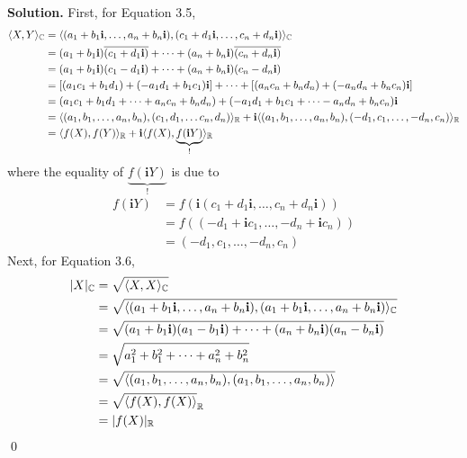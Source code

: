 \documentclass[12pt]{book}
\theoremstyle{definition}
\newenvironment{solution}
{%
  \par\noindent\textbf{Solution.}\quad
}
{%
  \qed\par
}
\begin{document}
\begin{solution} First, for Equation 3.5,
  \[
  \begin{aligned}
      \langle X, Y \rangle_{\mathbb{C}} &= \langle (a_1 + b_1\mathbf{i}, \dots , a_n + b_n\mathbf{i}), (c_1+d_1\mathbf{i}, \dots , c_n+d_n\mathbf{i}) \rangle_{\mathbb{C}} \\
                              &= (a_1 + b_1\mathbf{i})\overline{(c_1+d_1\mathbf{i})} + \dots + (a_n + b_n\mathbf{i})\overline{(c_n+d_n\mathbf{i})} \\
                              &= (a_1 + b_1\mathbf{i})(c_1-d_1\mathbf{i}) + \dots + (a_n + b_n\mathbf{i})(c_n-d_n\mathbf{i}) \\
                              &= [(a_1c_1 + b_1d_1) + (-a_1d_1 + b_1c_1)\mathbf{i}] + \dots + [(a_nc_n + b_nd_n) + (-a_nd_n + b_nc_n)\mathbf{i}] \\
                              &= (a_1c_1 + b_1d_1 + \dots + a_nc_n + b_nd_n) + (-a_1d_1 + b_1c_1 + \dots - a_nd_n + b_nc_n)\mathbf{i} \\
                              &= \langle (a_1, b_1, \dots , a_n, b_n), (c_1, d_1, \dots c_n, d_n) \rangle_{\mathbb{R}} + \mathbf{i}\langle (a_1, b_1, \dots , a_n, b_n), (-d_1, c_1, \dots , -d_n, c_n) \rangle_{\mathbb{R}} \\
                              &= \langle f(X), f(Y) \rangle_{\mathbb{R}} + \mathbf{i}\langle f(X), \underbrace{f(\mathbf{i}Y)}_! \rangle_{\mathbb{R}}
    \end{aligned}
  \]
  where the equality of $\underbrace{f(\mathbf{i}Y)}_!$ is due to
  \[
  \begin{aligned}
    f(\mathbf{i}Y) &= f(\mathbf{i}(c_1 + d_1\mathbf{i}, \dots , c_n + d_n\mathbf{i})) \\
                   &= f((-d_1 + \mathbf{i}c_1, \dots, -d_n + \mathbf{i}c_n)) \\
                   &= (-d_1, c_1, \dots, -d_n, c_n)
  \end{aligned}
  \]
  Next, for Equation 3.6,
  \[
  \begin{aligned}
    |X|_{\mathbb{C}} &= \sqrt{\langle X, X \rangle_{\mathbb{C}}} \\
           &= \sqrt{\langle (a_1 + b_1\mathbf{i}, \dots , a_n + b_n\mathbf{i}), (a_1 + b_1\mathbf{i}, \dots , a_n + b_n\mathbf{i}) \rangle_{\mathbb{C}}} \\
           &= \sqrt{(a_1 + b_1\mathbf{i})(a_1 - b_1\mathbf{i}) + \dots + (a_n + b_n\mathbf{i})(a_n - b_n\mathbf{i})} \\
           &= \sqrt{a_1^2 + b_1^2 + \dots + a_n^2 + b_n^2} \\
           &= \sqrt{\langle (a_1, b_1, \dots, a_n, b_n), (a_1, b_1, \dots, a_n, b_n) \rangle}\\
           &= \sqrt{\langle f(X), f(X) \rangle}_{\mathbb{R}} \\
           &= |f(X)|_{\mathbb{R}}
  \end{aligned}
  \]
\end{solution}
\end{document}
